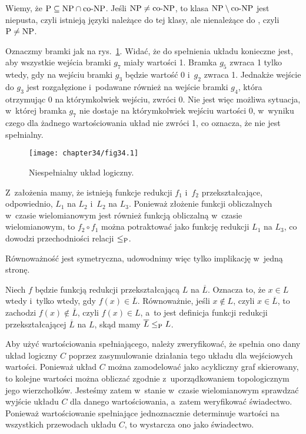 \exercise %
Wiemy, że $\text{P}\subseteq\text{NP}\cap\text{co-NP}$.
Jeśli $\text{NP}\ne\text{co-NP}$, to klasa $\text{NP}\setminus\text{co-NP}$ jest niepusta, czyli istnieją języki należące do tej klasy, ale nienależące do \Pclass, czyli $\text{P}\ne\text{NP}$.

\exercise %


\exercise %
Oznaczmy bramki jak na rys.\ \ref{fig:34.3-1}.
Widać, że do spełnienia układu konieczne jest, aby wszystkie wejścia bramki $g_7$ miały wartości 1.
Bramka $g_5$ zwraca 1 tylko wtedy, gdy na wejściu bramki $g_3$ będzie wartość 0 i~$g_2$ zwraca 1.
Jednakże wejście do $g_3$ jest rozgałęzione i~podawane również na wejście bramki $g_4$, która otrzymując 0 na którymkolwiek wejściu, zwróci 0.
Nie jest więc możliwa sytuacja, w~której bramka $g_7$ nie dostaje na którymkolwiek wejściu wartości 0, w~wyniku czego dla żadnego wartościowania układ nie zwróci 1, co oznacza, że nie jest spełnialny.
\begin{figure}[ht]
	\begin{center}
		\texttt{[image: chapter34/fig34.1]}
	\end{center}
	\caption{Niespełnialny układ logiczny.} \label{fig:34.3-1}
\end{figure}

\exercise %
Z~założenia mamy, że istnieją funkcje redukcji $f_1$ i~$f_2$ przekształcające, odpowiednio, $L_1$ na $L_2$ i~$L_2$ na $L_3$.
Ponieważ złożenie funkcji obliczalnych w~czasie wielomianowym jest również funkcją obliczalną w~czasie wielomianowym, to $f_2\circ f_1$ można potraktować jako funkcję redukcji $L_1$ na $L_3$, co dowodzi przechodniości relacji $\le_{\text{P}}$.

\exercise %
Równoważność jest symetryczna, udowodnimy więc tylko implikację w~jedną stronę.

Niech $f$ będzie funkcją redukcji przekształcającą $L$ na $\overline{L}$.
Oznacza to, że $x\in L$ wtedy i~tylko wtedy, gdy $f(x)\in\overline{L}$.
Równoważnie, jeśli $x\notin L$, czyli $x\in\overline{L}$, to zachodzi $f(x)\notin\overline{L}$, czyli $f(x)\in L$, a~to jest definicja funkcji redukcji przekształcającej $\overline{L}$ na $L$, skąd mamy $\overline{L}\le_{\text{P}} L$.

\exercise %
Aby użyć wartościowania spełniającego, należy zweryfikować, że spełnia ono dany układ logiczny $C$ poprzez zasymulowanie działania tego układu dla wejściowych wartości.
Ponieważ układ $C$ można zamodelować jako acykliczny graf skierowany, to kolejne wartości można obliczać zgodnie z~uporządkowaniem topologicznym jego wierzchołków.
Jesteśmy zatem w~stanie w~czasie wielomianowym sprawdzać wyjście układu $C$ dla danego wartościowania, a~zatem weryfikować świadectwo.
Ponieważ wartościowanie spełniające jednoznacznie determinuje wartości na wszystkich przewodach układu $C$, to wystarcza ono jako świadectwo.

